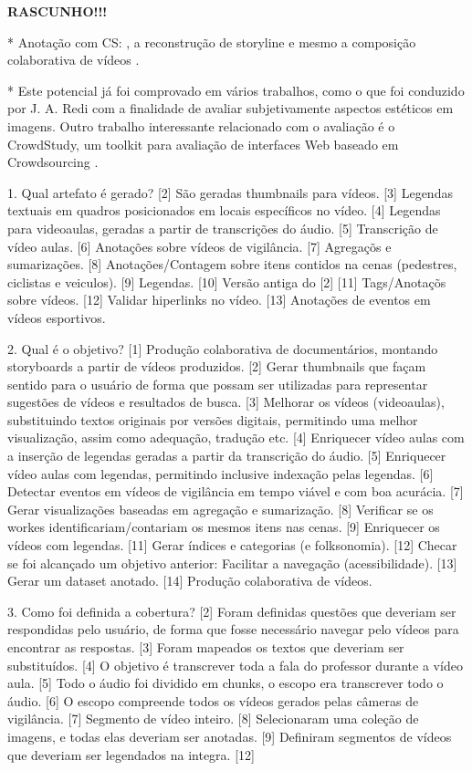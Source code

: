 \textbf{RASCUNHO!!!}

\cite{DiSalvo:2013:CAS:2501105.2501113}


* Anotação com CS: \cite{DiSalvo:2013:CAS:2501105.2501113}, a reconstrução de storyline \cite{Kim:2014:JSL:2679600.2680027} e mesmo a composição colaborativa de vídeos \cite{Wilk:2015:VCC:2713168.2713178}.

* Este potencial já foi comprovado em vários trabalhos, como o que foi conduzido por J. A. Redi \cite{Redi2013} com a finalidade de avaliar subjetivamente aspectos estéticos em imagens. Outro trabalho interessante relacionado com o avaliação é o CrowdStudy, um toolkit para avaliação de interfaces Web baseado em Crowdsourcing \cite{Nebeling}.

1.	Qual artefato é gerado?
[2] São geradas thumbnails para vídeos.
[3] Legendas textuais em quadros posicionados em locais específicos no vídeo.
[4] Legendas para videoaulas, geradas a partir de transcrições do áudio.
[5] Transcrição de vídeo aulas. 
[6] Anotações sobre vídeos de vigilância.
[7] Agregaçõs e sumarizações.
[8] Anotações/Contagem sobre itens contidos na cenas (pedestres, ciclistas e veiculos).
[9] Legendas.
[10] Versão antiga do [2]
[11] Tags/Anotaçõs sobre vídeos.
[12] Validar hiperlinks no vídeo.
[13] Anotações de eventos em vídeos esportivos. 

2.	Qual é o objetivo?
[1] Produção colaborativa de documentários, montando storyboards a partir de vídeos produzidos.
[2] Gerar thumbnails que façam sentido para o usuário de forma que possam ser utilizadas para representar sugestões de vídeos e resultados de busca.
[3] Melhorar os vídeos (videoaulas), substituindo textos originais por versões digitais, permitindo uma melhor visualização, assim como adequação, tradução etc.
[4] Enriquecer vídeo aulas com a inserção de legendas geradas a partir da transcrição do áudio.
[5] Enriquecer vídeo aulas com legendas, permitindo inclusive indexação pelas legendas.
[6] Detectar eventos em vídeos de vigilância em tempo viável e com boa acurácia. 
[7] Gerar visualizações baseadas em agregação e sumarização.
[8] Verificar se os workes identificariam/contariam os mesmos itens nas cenas.
[9] Enriquecer os vídeos com legendas.
[11] Gerar índices e categorias (e folksonomia).
[12] Checar se foi alcançado um objetivo anterior: Facilitar a navegação (acessibilidade).
[13] Gerar um dataset anotado.
[14] Produção colaborativa de vídeos.

3.	Como foi definida a cobertura?
[2] Foram definidas questões que deveriam ser respondidas pelo usuário, de forma que fosse necessário navegar pelo vídeos para encontrar as respostas.
[3] Foram mapeados os textos que deveriam ser substituídos.
[4] O objetivo é transcrever toda a fala do professor durante a vídeo aula.
[5] Todo o áudio foi dividido em chunks, o escopo era transcrever todo o áudio.
[6] O escopo compreende todos os vídeos gerados pelas câmeras de vigilância. 
[7] Segmento de vídeo inteiro.
[8] Selecionaram uma coleção de imagens, e todas elas deveriam ser anotadas.
[9] Definiram segmentos de vídeos que deveriam ser legendados na integra.
[12] 

